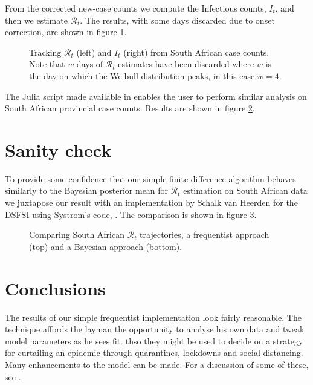 \documentclass[11pt]{article}
\begin{document}
From the corrected new-case counts we compute the Infectious counts, $I_t$,
and then we estimate $\mathcal{R}_t$. The results, with some days discarded due
to onset correction, are shown in figure \ref{fig_rt_inf_za}.

\begin{figure}[H]
\begin{center}
\end{center}
\caption{Tracking $\mathcal{R}_t$ (left) and $I_t$ (right) from South African case counts.
Note that $w$ days of $\mathcal{R}_t$ estimates have been discarded where $w$ is
the day on which the Weibull distribution peaks, in this case $w=4$.}  
\label{fig_rt_inf_za}
\end{figure}

The Julia script made available in \cite{murrell} enables the user to perform similar
analysis on South African provincial case counts. Results are shown in figure \ref{fig_rt_inf_prov}.

\begin{figure}[H]
\begin{center}
\end{center}
\label{fig_rt_inf_prov}
\end{figure}

\section{Sanity check}

To provide some confidence that our simple finite difference algorithm behaves
similarly to the Bayesian posterior mean for $\mathcal{R}_t$ estimation on
South African data we  juxtapose our result with an implementation by Schalk van Heerden
for the DSFSI \cite{dsfsi} using Systrom's code, \cite{systrom}. The comparison is shown in figure \ref{fig_heerden}.

\begin{figure}[H]
\begin{center}
\end{center}
\caption{Comparing South African $\mathcal{R}_t$ trajectories, a frequentist approach (top)
and a Bayesian approach (bottom).}
\label{fig_heerden}
\end{figure}

\section{Conclusions}
The results of our simple frequentist implementation look fairly reasonable.
The technique affords the layman the opportunity to analyse his own data
and tweak model parameters as he sees fit.
thso they might be
used to decide on a strategy for curtailing an epidemic through
quarantines, lockdowns and social distancing.  
Many enhancements to the model can be made.  For a discussion 
of some of these, see \cite{systrom}.  
\end{document}
